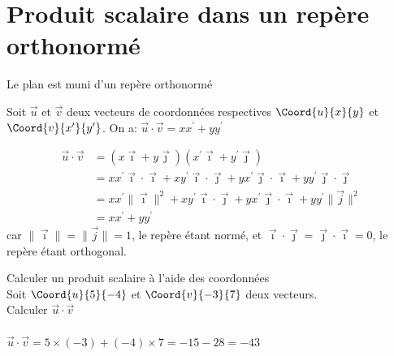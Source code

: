     \section{Produit scalaire dans un repère orthonormé}
    
    Le plan est muni d'un repère orthonormé \Rij
    
    \begin{propriete}
        Soit $\vec{u}$ et $\vec{v}$ deux vecteurs de coordonnées respectives $\Coord{u}{x}{y}$ et $\Coord{v}{x'}{y'}$. On a: $\vec{u} \cdot \vec{v}=x x^{\prime}+y y^{\prime}$
    \end{propriete}
    
    \begin{demonstration}
        \begin{align*}
            \vec{u} \cdot \vec{v}&=(x \vec{\imath}+y \vec{\jmath})\left(x^{\prime} \vec{\imath}+y^{\prime} \vec{\jmath}\right)\\
            &=x x^{\prime} \vec{\imath} \cdot \vec{\imath}+x y^{\prime} \vec{\imath} \cdot \vec{\jmath}+y x^{\prime} \vec{\jmath} \cdot \vec{\imath}+y y^{\prime} \vec{\jmath} \cdot \vec{\jmath}\\
            &=x x^{\prime}\|\vec{\imath}\|^{2}+x y^{\prime} \vec{\imath} \cdot \vec{\jmath}+y x^{\prime} \vec{\jmath} \cdot \vec{\imath}+y y^{\prime}\|\vec{j}\|^{2}\\
            &=x x^{\prime}+y y^{\prime}
        \end{align*}
        car $\|\vec{\imath}\|=\|\vec{j}\|=1$, le repère étant normé, et $\vec{\imath} \cdot \vec{\jmath}=\vec{\jmath} \cdot \vec{\imath}=0$, le repère étant orthogonal.
    \end{demonstration}
    
    \begin{methodeTitre}{Calculer un produit scalaire à l'aide des coordonnées}
        \\
        Soit $\Coord{u}{5}{-4}$ et $\Coord{v}{-3}{7}$ deux vecteurs.\\
        Calculer $\vec{u} \cdot \vec{v}$
        \ \\
        \\
        $\vec{u} \cdot \vec{v}=5 \times(-3)+(-4) \times 7=-15-28=-43$
    \end{methodeTitre}


